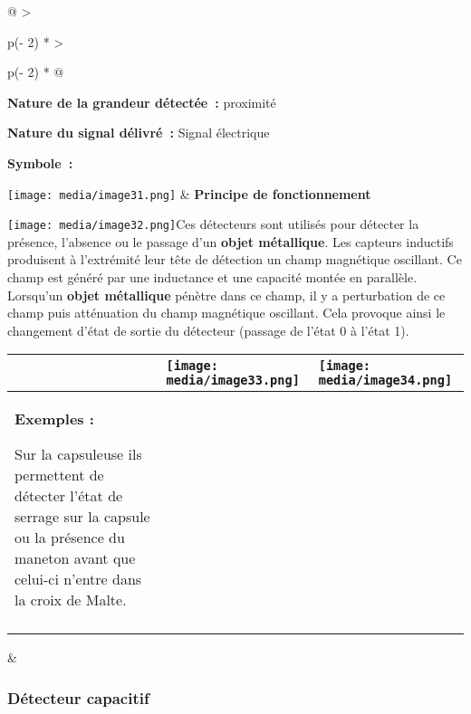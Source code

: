 \documentclass[
]{article}
\begin{document}
\begin{longtable}[]{@{}
  >{\raggedright\arraybackslash}p{(\columnwidth - 2\tabcolsep) * }
  >{\raggedright\arraybackslash}p{(\columnwidth - 2\tabcolsep) * }@{}}
\toprule
\textbf{Nature de la grandeur détectée~:} proximité

\textbf{Nature du signal délivré~:} Signal électrique

\textbf{Symbole~:}

\texttt{[image: media/image31.png]} &
\textbf{Principe de fonctionnement}

\texttt{[image: media/image32.png]}Ces
détecteurs sont utilisés pour détecter la présence, l'absence ou le
passage d'un \textbf{objet métallique}. Les capteurs inductifs
produisent à l'extrémité leur tête de détection un champ magnétique
oscillant. Ce champ est généré par une inductance et une capacité montée
en parallèle. Lorsqu'un \textbf{objet métallique} pénètre dans ce champ,
il y a perturbation de ce champ puis atténuation du champ magnétique
oscillant. Cela provoque ainsi le changement d'état de sortie du
détecteur (passage de l'état 0 à l'état 1). \\
\midrule
\endhead
\begin{minipage}[t]{\linewidth}\raggedright
\begin{longtable}[]{@{}
  >{\raggedright\arraybackslash}p{}
  >{\raggedright\arraybackslash}p{}
  >{\raggedright\arraybackslash}p{}@{}}
\toprule
& \texttt{[image: media/image33.png]}
&
\texttt{[image: media/image34.png]} \\
\midrule
\endhead
\textbf{Exemples :}

Sur la capsuleuse ils permettent de détecter l'état de serrage sur la
capsule ou la présence du maneton avant que celui-ci n'entre dans la
croix de Malte. & & \\
& & \\
\bottomrule
\end{longtable}
\end{minipage} & \\
\bottomrule
\end{longtable}

\hypertarget{duxe9tecteur-capacitif}{%
\subsubsection{Détecteur capacitif}\label{duxe9tecteur-capacitif}}
\end{document}
